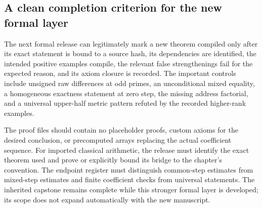 \subsection{A clean completion criterion for the new formal layer}
The next formal release can legitimately mark a new theorem compiled only after its exact statement is bound to a source hash, its dependencies are identified, the intended positive examples compile, the relevant false strengthenings fail for the expected reason, and its axiom closure is recorded. The important controls include unsigned raw differences at odd primes, an unconditional mixed equality, a homogeneous exactness statement at zero step, the missing address factorial, and a universal upper-half metric pattern refuted by the recorded higher-rank examples.

The proof files should contain no placeholder proofs, custom axioms for the desired conclusion, or precomputed arrays replacing the actual coefficient sequence. For imported classical arithmetic, the release must identify the exact theorem used and prove or explicitly bound its bridge to the chapter's convention. The endpoint register must distinguish common-step estimates from mixed-step estimates and finite coefficient checks from universal statements. The inherited capstone remains complete while this stronger formal layer is developed; its scope does not expand automatically with the new manuscript.
